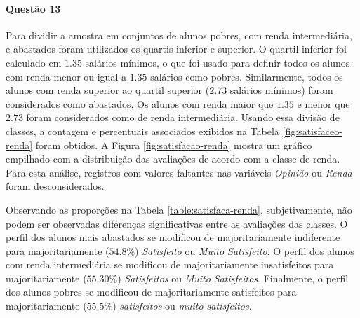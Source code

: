 \documentclass[10pt,a4paper,oneside]{article}
\begin{document}

\FloatBarrier

\paragraph{Questão 13}

Para dividir a amostra em conjuntos de alunos pobres, com renda intermediária, e abastados foram utilizados os quartis inferior e superior. O quartil inferior foi calculado em $1.35$ salários mínimos, o que foi usado para definir todos os alunos com renda menor ou igual a $1.35$ salários como pobres. Similarmente, todos os alunos com renda superior ao quartil superior ($2.73$ salários mínimos) foram considerados como abastados. Os alunos com renda maior que $1.35$ e menor que $2.73$ foram considerados como de renda intermediária. Usando essa divisão de classes, a contagem e percentuais associados exibidos na Tabela \ref{fig:satisfaceo-renda} foram obtidos. A Figura \ref{fig:satisfacao-renda} mostra um gráfico empilhado com a distribuição das avaliações de acordo com a classe de renda. Para esta análise, registros com valores faltantes nas variáveis \textit{Opinião} ou \textit{Renda} foram desconsiderados.

Observando as proporções na Tabela \ref{table:satisfaca-renda}, subjetivamente, não podem ser observadas diferenças significativas entre as avaliações das classes. O perfil dos alunos mais abastados se modificou de majoritariamente indiferente para majoritariamente ($54.8\%$) \textit{Satisfeito} ou \textit{Muito Satisfeito}. O perfil dos alunos com renda intermediária se modificou de majoritariamente insatisfeitos para majoritariamente ($55.30\%$) \textit{Satisfeitos} ou \textit{Muito Satisfeitos}. Finalmente, o perfil dos alunos pobres se modificou de majoritariamente satisfeitos para majoritariamente ($55.5\%$) \textit{satisfeitos} ou \textit{muito satisfeitos}.
\end{document}

